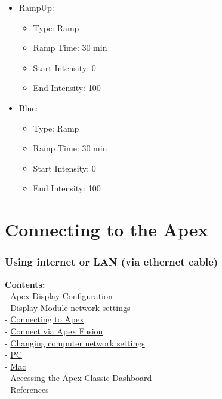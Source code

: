 \documentclass[
]{book}
\providecommand{\tightlist}{%
  \setlength{\itemsep}{0pt}\setlength{\parskip}{0pt}}
\begin{document}
\begin{itemize}
\tightlist
\item
  RampUp:

  \begin{itemize}
  \tightlist
  \item
    Type: Ramp
  \item
    Ramp Time: 30 min
  \item
    Start Intensity: 0
  \item
    End Intensity: 100
  \end{itemize}
\item
  Blue:

  \begin{itemize}
  \tightlist
  \item
    Type: Ramp
  \item
    Ramp Time: 30 min
  \item
    Start Intensity: 0
  \item
    End Intensity: 100
  \end{itemize}
\end{itemize}

\hypertarget{connecting-to-the-apex}{%
\chapter{Connecting to the Apex}\label{connecting-to-the-apex}}

\hypertarget{using-internet-or-lan-via-ethernet-cable}{%
\subsection{Using internet or LAN (via ethernet cable)}\label{using-internet-or-lan-via-ethernet-cable}}

\textbf{Contents:}\\
- \protect\hyperlink{apex_display_configuration}{Apex Display Configuration}\\
- \protect\hyperlink{display_module_network_settings}{Display Module network settings}\\
- \protect\hyperlink{connect_apex}{Connecting to Apex}\\
- \protect\hyperlink{apex_fusion_link}{Connect via Apex Fusion}\\
- \protect\hyperlink{network_settings}{Changing computer network settings}\\
- \protect\hyperlink{pc}{PC}\\
- \protect\hyperlink{mac}{Mac}\\
- \protect\hyperlink{apex_classic_dashboard}{Accessing the Apex Classic Dashboard}\\
- \protect\hyperlink{references}{References}
\end{document}
